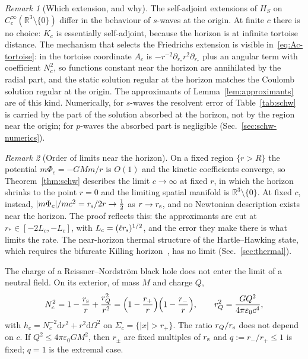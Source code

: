 \documentclass[%
 aip,
 jmp,
 amsmath,amssymb,
 reprint, onecolumn
]{revtex4-1}
\theoremstyle{definition}
\theoremstyle{remark}
\newtheorem{remark}{Remark}
\newcommand{\R}{\mathbb{R}}
\newcommand{\rmd}{\mathrm{d}}
\begin{document}
\begin{remark}[Which extension, and why]\label{rem:friedrichs}
The self-adjoint extensions of $H_S$ on $C_c^\infty(\R^3\setminus\{0\})$
differ in the behaviour of $s$-waves at the origin. At finite $c$ there
is no choice: $K_c$ is essentially self-adjoint, because the horizon
is at infinite tortoise distance. The mechanism that selects the
Friedrichs extension is visible in~\eqref{eq:Ac-tortoise}: in the
tortoise coordinate $A_c$ is $-r^{-2}\partial_{r_*}r^2\partial_{r_*}$
plus an angular term with coefficient $N_c^2$, so functions constant near
the horizon are annihilated by the radial part, and the static solution
regular at the horizon matches the Coulomb solution regular at the
origin. The approximants of Lemma~\ref{lem:approximants} are of this
kind. Numerically, for $s$-waves the resolvent error of
Table~\ref{tab:schw} is carried by the part of the solution absorbed at
the horizon, not by the region near the origin; for $p$-waves the
absorbed part is negligible (Sec.~\ref{sec:schw-numerics}).
\end{remark}

\begin{remark}[Order of limits near the horizon]\label{rem:order-limits}
On a fixed region $\{r>R\}$ the potential $m\Phi_c=-GMm/r$ is
$O(1)$ and the kinetic coefficients converge, so Theorem~\ref{thm:schw}
describes the limit $c\to\infty$ at fixed $r$, in which the horizon
shrinks to the point $r=0$ and the limiting spatial manifold is
$\R^3\setminus\{0\}$. At fixed $c$, instead, $|m\Phi_c|/mc^2=r_{\rm s}/2r\to
\frac12$ as $r\to r_{\rm s}$, and no Newtonian description exists near
the horizon. The proof reflects this: the approximants are cut at
$r_*\in[-2L_c,-L_c]$, with $L_c=(\ell r_{\rm s})^{1/2}$, and the error
they make there is what limits the rate. The near-horizon thermal
structure of the Hartle--Hawking state, which requires the bifurcate
Killing horizon~\cite{KayWald1991}, has no limit
(Sec.~\ref{sec:thermal}).
\end{remark}

The charge of a Reissner--Nordstr\"om black hole does not enter the
limit of a neutral field. On its exterior, of mass $M$ and charge $Q$,
\[
N_c^2=1-\frac{r_{\rm s}}{r}+\frac{r_Q^2}{r^2}=\Bigl(1-\frac{r_+}{r}\Bigr)
\Bigl(1-\frac{r_-}{r}\Bigr),\qquad r_Q^2=\frac{GQ^2}{4\pi\varepsilon_0c^4},
\]
with $h_c=N_c^{-2}\rmd r^2+r^2\rmd\Omega^2$ on $\Sigma_c=\{|x|>r_+\}$. The
ratio $r_Q/r_{\rm s}$ does not depend on $c$. If $Q^2\leq4\pi\varepsilon_0
GM^2$, then $r_\pm$ are fixed multiples of $r_{\rm s}$ and $q:=r_-/r_+
\leq1$ is fixed; $q=1$ is the extremal case.
\end{document}
